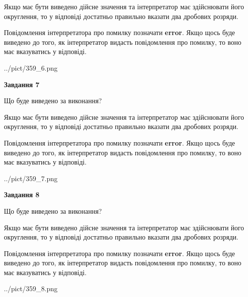\documentclass[12pt, ukrainian]{article}
\begin{document}
{\begin {Large}
Якщо має бути виведено дійсне значення та інтерпретатор має здійснювати його округлення, 
то у відповіді достатньо правильно вказати два дробових розряди.

Повідомлення інтерпретатора про помилку позначати \textbf{error}.
Якщо щось буде виведено до того, як інтерпретатор видасть повідомлення про помилку, 
то воно має вказуватись у відповіді. \par

\begin{center}
	{../pict/359_6.png}
\end{center}
\newpage

{\begin {center}\textbf{Завдання 7}\end {center}}\par
Що буде виведено за виконання? \par

Якщо має бути виведено дійсне значення та інтерпретатор має здійснювати його округлення, 
то у відповіді достатньо правильно вказати два дробових розряди.

Повідомлення інтерпретатора про помилку позначати \textbf{error}.
Якщо щось буде виведено до того, як інтерпретатор видасть повідомлення про помилку, 
то воно має вказуватись у відповіді. \par

\begin{center}
	{../pict/359_7.png}
\end{center}
\newpage

{\begin {center}\textbf{Завдання 8}\end {center}}\par
Що буде виведено за виконання? \par

Якщо має бути виведено дійсне значення та інтерпретатор має здійснювати його округлення, 
то у відповіді достатньо правильно вказати два дробових розряди.

Повідомлення інтерпретатора про помилку позначати \textbf{error}.
Якщо щось буде виведено до того, як інтерпретатор видасть повідомлення про помилку, 
то воно має вказуватись у відповіді. \par

\begin{center}
	{../pict/359_8.png}
\end{center}
\newpage


\end{Large}}
\end{document}
